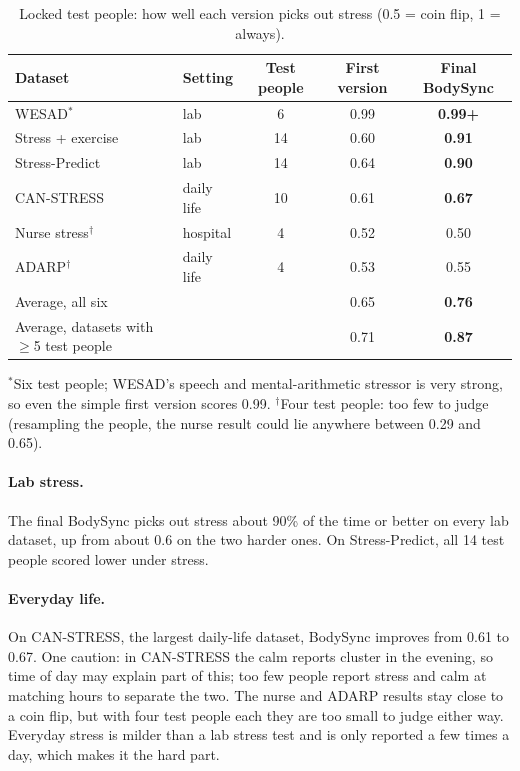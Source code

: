 \documentclass{article}
\begin{document}
\begin{table}[H]
\centering\small
\caption{Locked test people: how well each version picks out stress (0.5 = coin flip, 1 = always).}
\begin{tabular}{llccc}
\toprule
Dataset & Setting & Test people & First version & Final BodySync \\
\midrule
WESAD$^*$ & lab & 6 & 0.99 & \textbf{0.99+} \\
Stress + exercise & lab & 14 & 0.60 & \textbf{0.91} \\
Stress-Predict & lab & 14 & 0.64 & \textbf{0.90} \\
CAN-STRESS & daily life & 10 & 0.61 & \textbf{0.67} \\
Nurse stress$^\dagger$ & hospital & 4 & 0.52 & 0.50 \\
ADARP$^\dagger$ & daily life & 4 & 0.53 & 0.55 \\
\midrule
Average, all six & & & 0.65 & \textbf{0.76} \\
Average, datasets with $\ge$5 test people & & & 0.71 & \textbf{0.87} \\
\bottomrule
\end{tabular}

\smallskip
\footnotesize $^*$Six test people; WESAD's speech and mental-arithmetic stressor is very strong, so even the simple first version scores 0.99. $^\dagger$Four test people: too few to judge (resampling the people, the nurse result could lie anywhere between 0.29 and 0.65).
\end{table}

\paragraph{Lab stress.} The final BodySync picks out stress about 90\% of the time or better on every lab dataset, up from about 0.6 on the two harder ones. On Stress-Predict, all 14 test people scored lower under stress.

\paragraph{Everyday life.} On CAN-STRESS, the largest daily-life dataset, BodySync improves from 0.61 to 0.67. One caution: in CAN-STRESS the calm reports cluster in the evening, so time of day may explain part of this; too few people report stress and calm at matching hours to separate the two. The nurse and ADARP results stay close to a coin flip, but with four test people each they are too small to judge either way. Everyday stress is milder than a lab stress test and is only reported a few times a day, which makes it the hard part.
\end{document}
